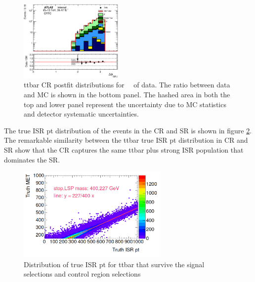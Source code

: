 \begin{figure}[htbp]
\begin{center}
        \includegraphics[width=0.45\textwidth]{figures/ttbar/postfit/CA_dphiISRI_CRTopC_log}
  \end{center}
  \caption{ttbar CR postfit distributions for \intlumi\ \ifb\ of data. The ratio between data and MC is shown in the bottom panel. The hashed area in both the top and lower panel represent the uncertainty due to MC statistics and detector systematic uncertainties.}
  \label{fig:CRTopC}
\end{figure}

The true ISR pt distribution of the events in the CR and SR is shown in figure \ref{fig:ttbar:CR:trueISRpt}. The remarkable similarity between the ttbar true ISR pt distribution in CR and SR show that the CR captures the same ttbar plus strong ISR population that dominates the SR.  \\

\begin{figure}[h!]
  \centering
	\includegraphics[width=0.65\textwidth]{./figures/MET_ISR.png}
\caption{\label{fig:ttbar:CR:trueISRpt}{Distribution of true ISR pt for ttbar that survive the signal selections and control region selections}}
\end{figure}

